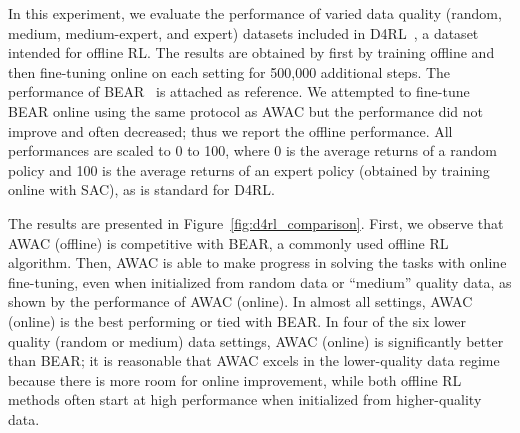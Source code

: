\documentclass[conference]{IEEEtran}
\begin{document}
In this experiment, we evaluate the performance of varied data quality (random, medium, medium-expert, and expert) datasets included in D4RL~\citep{fu2020d4rl}, a dataset intended for offline RL. The results are obtained by first by training offline and then fine-tuning online on each setting for 500,000 additional steps. The performance of BEAR~\citep{kumar19bear} is attached as reference. We attempted to fine-tune BEAR online using the same protocol as AWAC but the performance did not improve and often decreased; thus we report the offline performance. All performances are scaled to 0 to 100, where 0 is the average returns of a random policy and 100 is the average returns of an expert policy (obtained by training online with SAC), as is standard for D4RL.

The results are presented in Figure~\ref{fig:d4rl_comparison}. First, we observe that AWAC (offline) is competitive with BEAR, a commonly used offline RL algorithm. Then, AWAC is able to make progress in solving the tasks with online fine-tuning, even when initialized from random data or “medium” quality data, as shown by the performance of AWAC (online). In almost all settings, AWAC (online) is the best performing or tied with BEAR. In four of the six lower quality (random or medium) data settings, AWAC (online) is significantly better than BEAR; it is reasonable that AWAC excels in the lower-quality data regime because there is more room for online improvement, while both offline RL methods often start at high performance when initialized from higher-quality data.
\end{document}
